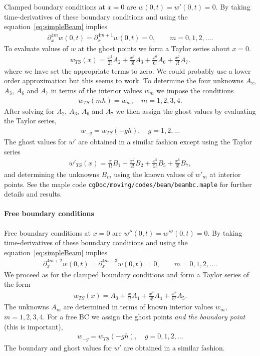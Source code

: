 \documentclass[11pt]{article}
\begin{document}
Clamped boundary conditions at $x=0$ are $w(0,t)=w'(0,t)=0$. 
By taking time-derivatives of these boundary conditions and using the equation~\eqref{eq:simpleBeam}
implies
\begin{align}
     \partial_x^{4m}w(0,t) = \partial_x^{4m+1}w(0,t)=0, \qquad m=0,1,2,\ldots.
\end{align}
To evaluate values of $w$ at the ghost points we form a Taylor series about $x=0$. 
\begin{align}
     w_{TS}(x) =  \frac{x^2}{2!} A_2 + \frac{x^3}{3!} A_3 + \frac{x^6}{6!} A_6 + \frac{x^7}{7!} A_7 .
\end{align}
where we have set the appropriate terms to zero.
We could probably use a lower order approximation but this seems to work.
To determine the four unknowns $A_2$, $A_3$, $A_6$ and $A_7$ in terms of the interior values $w_m$
we impose the conditions
\begin{align}
     w_{TS}(m h) =  w_{m} , \quad m=1,2,3,4.
\end{align}
After solving for $A_2$, $A_3$, $A_6$ and $A_7$ we then assign the ghost values by evaluating the
Taylor series, 
\begin{align}
   w_{-g} =  w_{TS}(-g h) , \quad g=1,2,\ldots
\end{align}
%
The ghost values for $w'$ are obtained in a similar fashion except using the Taylor series
\begin{align}
     w'_{TS}(x) =  \frac{x}{1!} B_1 + \frac{x^2}{2!} B_2 + \frac{x^5}{5!} B_5 + \frac{x^6}{6!} B_7 ,
\end{align}
and determining the unknowns $B_m$ using the known values of $w'_m$ at interior points.
See the maple code {\tt cgDoc/moving/codes/beam/beambc.maple} for further details and results.

\paragraph{Free boundary conditions}

Free boundary conditions at $x=0$ are $w''(0,t)=w'''(0,t)=0$.
By taking time-derivatives of these boundary conditions and using the equation~\eqref{eq:simpleBeam}
implies
\begin{align}
     \partial_x^{4m+2}w(0,t) = \partial_x^{4m+3}w(0,t)=0, \qquad m=0,1,2,\ldots.
\end{align}
We proceed as for the clamped boundary conditions and form a Taylor series of
the form
\begin{align}
     w_{TS}(x) =  A_0 + \frac{x}{1!} A_1  + \frac{x^4}{4!} A_4 + \frac{x^5}{5!} A_5 .
\end{align}
The unknowns  $A_m$ are determined in terms of known interior values $w_m$, $m=1,2,3,4$. 
For a free BC we assign the ghost points {\em and the boundary point} (this is important), 
\begin{align}
   w_{-g} =  w_{TS}(-g h) , \quad g=0,1,2,\ldots
\end{align}
The boundary and ghost values for $w'$ are obtained in a similar fashion.
\end{document}

